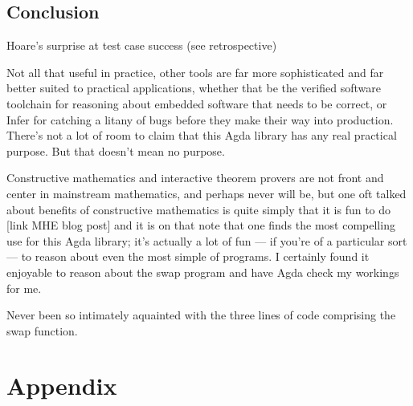 \documentclass[oneside,12pt]{article}
\begin{document}
\subsection{Conclusion}

Hoare's surprise at test case success (see retrospective)

Not all that useful in practice, other tools are far more sophisticated and far better suited to practical applications, whether that be the verified software toolchain for reasoning about embedded software that needs to be correct, or Infer for catching a litany of bugs before they make their way into production. There's not a lot of room to claim that this Agda library has any real practical purpose. But that doesn't mean no purpose.

Constructive mathematics and interactive theorem provers are not front and center in mainstream mathematics, and perhaps never will be, but one oft talked about benefits of constructive mathematics is quite simply that it is fun to do [link MHE blog post] and it is on that note that one finds the most compelling use for this Agda library; it's actually a lot of fun --- if you're of a particular sort --- to reason about even the most simple of programs. I certainly found it enjoyable to reason about the swap program and have Agda check my workings for me.

Never been so intimately aquainted with the three lines of code comprising the swap function.


\section{Appendix}


\nocite{*}






  
\end{document}
